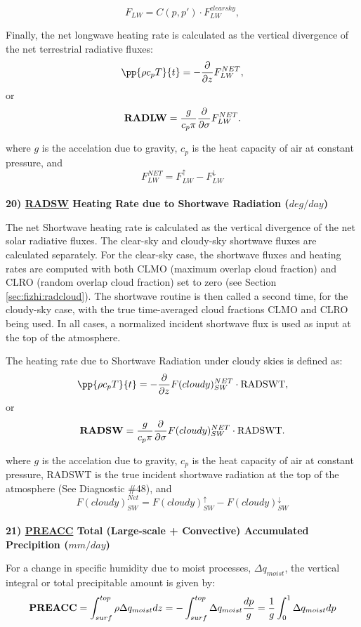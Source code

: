 \noindent
\[
F_{LW} = C(p,p') \cdot F^{clearsky}_{LW},
\]

\noindent
Finally, the net longwave heating rate is calculated as the vertical divergence of the
net terrestrial radiative fluxes:
\[
\pp{\rho c_p T}{t} = - {\partial \over \partial z} F_{LW}^{NET} ,
\]
or
\[
{\bf RADLW} = \frac{g}{c_p \pi} {\partial \over \partial \sigma} F_{LW}^{NET} .
\]

\noindent
where $g$ is the accelation due to gravity,
$c_p$ is the heat capacity of air at constant pressure,
and
\[
F_{LW}^{NET} = F_{LW}^\uparrow - F_{LW}^\downarrow
\]
\\


\noindent
{\bf 20)  \underline {RADSW} Heating Rate due to Shortwave Radiation ($deg/day$) }

\noindent
The net Shortwave heating rate is calculated as the vertical divergence of the
net solar radiative fluxes.
The clear-sky and cloudy-sky shortwave fluxes are calculated separately.
For the clear-sky case, the shortwave fluxes and heating rates are computed with
both CLMO (maximum overlap cloud fraction) and
CLRO (random overlap cloud fraction) set to zero (see Section \ref{sec:fizhi:radcloud}).
The shortwave routine is then called a second time, for the cloudy-sky case, with the
true time-averaged cloud fractions CLMO
and CLRO being used.  In all cases, a normalized incident shortwave flux is used as
input at the top of the atmosphere.

\noindent
The heating rate due to Shortwave Radiation under cloudy skies is defined as:
\[
\pp{\rho c_p T}{t} = - {\partial \over \partial z} F(cloudy)_{SW}^{NET} \cdot {\rm RADSWT},
\]
or
\[
{\bf RADSW} = \frac{g}{c_p \pi} {\partial \over \partial \sigma} F(cloudy)_{SW}^{NET}\cdot {\rm RADSWT} .
\]

\noindent
where $g$ is the accelation due to gravity,
$c_p$ is the heat capacity of air at constant pressure, RADSWT is the true incident
shortwave radiation at the top of the atmosphere (See Diagnostic \#48), and
\[
F(cloudy)_{SW}^{Net} = F(cloudy)_{SW}^\uparrow - F(cloudy)_{SW}^\downarrow
\]
\\

\noindent
{\bf 21)  \underline {PREACC} Total (Large-scale + Convective) Accumulated Precipition ($mm/day$) } 

\noindent
For a change in specific humidity due to moist processes, $\Delta q_{moist}$, 
the vertical integral or total precipitable amount is given by:   
\[
{\bf PREACC} = \int_{surf}^{top} \rho \Delta q_{moist} dz = - \int_{surf}^{top} \Delta  q_{moist}
{dp \over g} = {1 \over g} \int_0^1 \Delta q_{moist} dp
\]
\\

